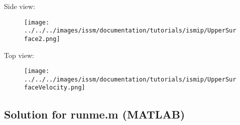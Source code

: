 Side view:
\begin{figure}[H]
	\begin{center}
		\texttt{[image: ../../../images/issm/documentation/tutorials/ismip/UpperSurface2.png]}
	\end{center}
\end{figure}
Top view:
\begin{figure}[H]
	\begin{center}
		\texttt{[image: ../../../images/issm/documentation/tutorials/ismip/UpperSurfaceVelocity.png]}
	\end{center}
\end{figure}
\subsection{Solution for runme.m (MATLAB)}%
